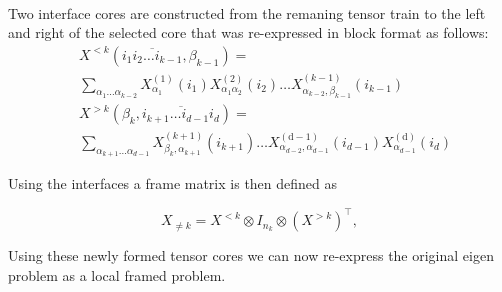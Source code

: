\documentclass[%
 aip,12pt
 amsmath,amssymb,
 reprint,%
]{revtex4-1}
\begin{document}
\\
Two interface cores are constructed from the remaning tensor train to the left and right of the selected core that was re-expressed in block format as follows:
\begin{equation}
\begin{split}
&X^{<k}\left(\overline{i_{1} i_{2} \ldots i_{k-1}}, \beta_{k-1}\right)=
\\
&\sum_{\alpha_{1} \ldots \alpha_{k-2}} X_{\alpha_{1}}^{(1)}\left(i_{1}\right) X_{\alpha_{1} \alpha_{2}}^{(2)}\left(i_{2}\right) \ldots X_{\alpha_{k-2}, \beta_{k-1}}^{(k-1)}\left(i_{k-1}\right) \\
&X^{>k}\left(\beta_{k}, \overline{i_{k+1} \ldots i_{d-1} i_{d}}\right)=
\\
&\sum_{\alpha_{k+1} \ldots \alpha_{d-1}} X_{\beta_{k}, \alpha_{k+1}}^{(k+1)}\left(i_{k+1}\right) \ldots X_{\alpha_{d-2}, \alpha_{d-1}}^{(\mathrm{d}-1)}\left(i_{d-1}\right) X_{\alpha_{d-1}}^{(\mathrm{d})}\left(i_{d}\right)
  \end{split}
  \end{equation}

Using the interfaces a frame matrix is then defined as

\begin{equation}
  X_{\neq k}=X^{<k} \otimes I_{n_{k}} \otimes\left(X^{>k}\right)^{\top},
\end{equation}

Using these newly formed tensor cores we can now re-express the original eigen problem as a local framed problem.
\end{document}
